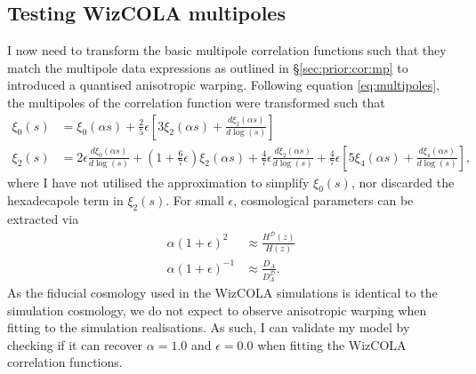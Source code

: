 \documentclass[titlesmallcaps, examinerscopy, copyrightpage]{uqthesis}
\begin{document}
\subsection{Testing WizCOLA multipoles}

I now need to transform the basic multipole correlation functions such that they match the multipole data expressions as outlined in \S\ref{sec:prior:cor:mp} to introduced a quantised anisotropic warping. Following equation \eqref{eq:multipoles}, the multipoles of the correlation function were transformed such that
\begin{align}
\xi_0(s) &= \xi_0(\alpha s) + \frac{2}{5}\epsilon \left[ 3 \xi_2(\alpha s) + \frac{d \xi_2(\alpha s)}{d \log(s)}\right] \\
\xi_2(s) &= 2\epsilon \frac{d \xi_0(\alpha s)}{d\log(s)} + \left( 1 + \frac{6}{7}\epsilon\right) \xi_2(\alpha s) + \frac{4}{7} \epsilon \frac{d \xi_2(\alpha s)}{d \log(s)} + \frac{4}{7}\epsilon \left[ 5 \xi_4 (\alpha s) + \frac{d \xi_4(\alpha s)}{d \log(s)} \right] ,
\end{align}
where I have not utilised the approximation to simplify $\xi_0(s)$, nor discarded the hexadecapole term in $\xi_2(s)$. For small $\epsilon$, cosmological parameters can be extracted via
\begin{align}
\alpha(1 + \epsilon)^2 &\approx \frac{H^\mathcal{D}(z)}{H(z)} \\
\alpha(1 + \epsilon)^{-1} &\approx \frac{D_A}{D_A^\mathcal{D}}.
\end{align}
As the fiducial cosmology used in the WizCOLA simulations is identical to the simulation cosmology, we do not expect to observe anisotropic warping when fitting to the simulation realisations. As such, I can validate my model by checking if it can recover $\alpha = 1.0$ and $\epsilon = 0.0$ when fitting the WizCOLA correlation functions.
\end{document}
